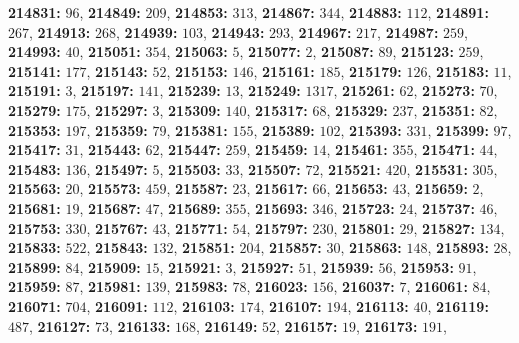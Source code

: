 \textsf{\bfseries 214831:} $96$, \textsf{\bfseries 214849:} $209$, \textsf{\bfseries 214853:} $313$, \textsf{\bfseries 214867:} $344$, \textsf{\bfseries 214883:} $112$, \textsf{\bfseries 214891:} $267$, \textsf{\bfseries 214913:} $268$, \textsf{\bfseries 214939:} $103$, \textsf{\bfseries 214943:} $293$, \textsf{\bfseries 214967:} $217$, \textsf{\bfseries 214987:} $259$, \textsf{\bfseries 214993:} $40$, \textsf{\bfseries 215051:} $354$, \textsf{\bfseries 215063:} $5$, \textsf{\bfseries 215077:} $2$, \textsf{\bfseries 215087:} $89$, \textsf{\bfseries 215123:} $259$, \textsf{\bfseries 215141:} $177$, \textsf{\bfseries 215143:} $52$, \textsf{\bfseries 215153:} $146$, \textsf{\bfseries 215161:} $185$, \textsf{\bfseries 215179:} $126$, \textsf{\bfseries 215183:} $11$, \textsf{\bfseries 215191:} $3$, \textsf{\bfseries 215197:} $141$, \textsf{\bfseries 215239:} $13$, \textsf{\bfseries 215249:} $1317$, \textsf{\bfseries 215261:} $62$, \textsf{\bfseries 215273:} $70$, \textsf{\bfseries 215279:} $175$, \textsf{\bfseries 215297:} $3$, \textsf{\bfseries 215309:} $140$, \textsf{\bfseries 215317:} $68$, \textsf{\bfseries 215329:} $237$, \textsf{\bfseries 215351:} $82$, \textsf{\bfseries 215353:} $197$, \textsf{\bfseries 215359:} $79$, \textsf{\bfseries 215381:} $155$, \textsf{\bfseries 215389:} $102$, \textsf{\bfseries 215393:} $331$, \textsf{\bfseries 215399:} $97$, \textsf{\bfseries 215417:} $31$, \textsf{\bfseries 215443:} $62$, \textsf{\bfseries 215447:} $259$, \textsf{\bfseries 215459:} $14$, \textsf{\bfseries 215461:} $355$, \textsf{\bfseries 215471:} $44$, \textsf{\bfseries 215483:} $136$, \textsf{\bfseries 215497:} $5$, \textsf{\bfseries 215503:} $33$, \textsf{\bfseries 215507:} $72$, \textsf{\bfseries 215521:} $420$, \textsf{\bfseries 215531:} $305$, \textsf{\bfseries 215563:} $20$, \textsf{\bfseries 215573:} $459$, \textsf{\bfseries 215587:} $23$, \textsf{\bfseries 215617:} $66$, \textsf{\bfseries 215653:} $43$, \textsf{\bfseries 215659:} $2$, \textsf{\bfseries 215681:} $19$, \textsf{\bfseries 215687:} $47$, \textsf{\bfseries 215689:} $355$, \textsf{\bfseries 215693:} $346$, \textsf{\bfseries 215723:} $24$, \textsf{\bfseries 215737:} $46$, \textsf{\bfseries 215753:} $330$, \textsf{\bfseries 215767:} $43$, \textsf{\bfseries 215771:} $54$, \textsf{\bfseries 215797:} $230$, \textsf{\bfseries 215801:} $29$, \textsf{\bfseries 215827:} $134$, \textsf{\bfseries 215833:} $522$, \textsf{\bfseries 215843:} $132$, \textsf{\bfseries 215851:} $204$, \textsf{\bfseries 215857:} $30$, \textsf{\bfseries 215863:} $148$, \textsf{\bfseries 215893:} $28$, \textsf{\bfseries 215899:} $84$, \textsf{\bfseries 215909:} $15$, \textsf{\bfseries 215921:} $3$, \textsf{\bfseries 215927:} $51$, \textsf{\bfseries 215939:} $56$, \textsf{\bfseries 215953:} $91$, \textsf{\bfseries 215959:} $87$, \textsf{\bfseries 215981:} $139$, \textsf{\bfseries 215983:} $78$, \textsf{\bfseries 216023:} $156$, \textsf{\bfseries 216037:} $7$, \textsf{\bfseries 216061:} $84$, \textsf{\bfseries 216071:} $704$, \textsf{\bfseries 216091:} $112$, \textsf{\bfseries 216103:} $174$, \textsf{\bfseries 216107:} $194$, \textsf{\bfseries 216113:} $40$, \textsf{\bfseries 216119:} $487$, \textsf{\bfseries 216127:} $73$, \textsf{\bfseries 216133:} $168$, \textsf{\bfseries 216149:} $52$, \textsf{\bfseries 216157:} $19$, \textsf{\bfseries 216173:} $191$, 
